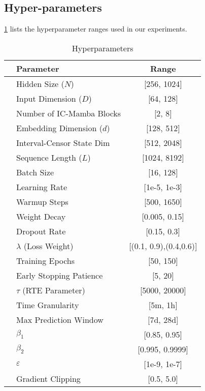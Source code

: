 \subsection{Hyper-parameters}
\label{subsec:hyper-parameters}
\cref{tab:hyperparameters} lists the hyperparameter ranges used in our experiments.
\begin{table}[htb]
\caption{\icmamba Hyperparameters}
\label{tab:hyperparameters}
\begin{tabular}{llc}
\toprule
\toprule
 & \textbf{Parameter} & \textbf{Range} \\
\midrule
& Hidden Size ($N$) & [256, 1024] \\
& Input Dimension ($D$) & [64, 128] \\
& Number of IC-Mamba Blocks & [2, 8] \\
& Embedding Dimension ($d$) & [128, 512] \\
& Interval-Censor State Dim & [512, 2048] \\
& Sequence Length ($L$) & [1024, 8192] \\
\midrule
& Batch Size & [16, 128] \\
& Learning Rate & [1e-5, 1e-3] \\
& Warmup Steps & [500, 1650] \\
& Weight Decay & [0.005, 0.15] \\
& Dropout Rate & [0.15, 0.3] \\
& $\lambda$ (Loss Weight) & [(0.1, 0.9),(0.4,0.6)] \\
& Training Epochs & [50, 150] \\
& Early Stopping Patience & [5, 20] \\
\midrule
& $\tau$ (RTE Parameter) & [5000, 20000] \\
& Time Granularity & [5m, 1h] \\
& Max Prediction Window & [7d, 28d] \\
\midrule
& $\beta_1$ & [0.85, 0.95] \\
& $\beta_2$ & [0.995, 0.9999] \\
& $\varepsilon$ & [1e-9, 1e-7] \\
& Gradient Clipping & [0.5, 5.0] \\
\bottomrule
\bottomrule
\end{tabular}
\end{table}


